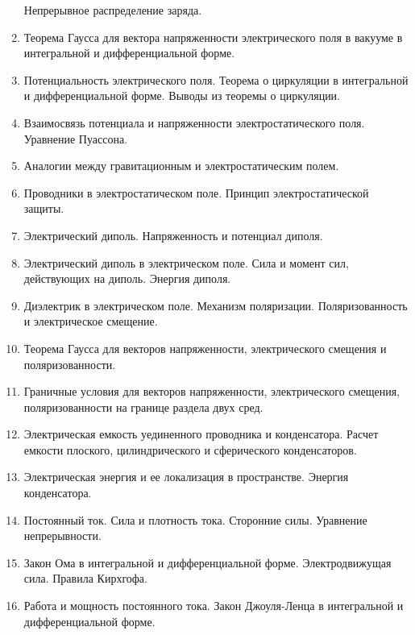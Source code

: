 \documentclass[12pt]{article}
\begin{document}
\begin{enumerate}
        Непрерывное распределение заряда.  
        \item Теорема Гаусса для вектора напряженности электрического поля в вакууме в 
        интегральной и дифференциальной форме.  
        \item Потенциальность электрического поля. Теорема о циркуляции в интегральной и 
        дифференциальной форме. Выводы из теоремы о циркуляции. 
        \item Взаимосвязь потенциала и напряженности электростатического поля. Уравнение 
        Пуассона.  
        \item Аналогии между гравитационным и электростатическим полем.  
        \item Проводники в электростатическом поле. Принцип электростатической защиты.  
        \item Электрический диполь. Напряженность и потенциал диполя. 
        \item Электрический диполь в электрическом поле. Сила и момент сил, действующих на 
        диполь. Энергия диполя. 
        \item Диэлектрик в электрическом поле. Механизм поляризации. Поляризованность и 
        электрическое смещение. 
        \item Теорема Гаусса для векторов напряженности, электрического смещения и 
        поляризованности.  
        \item Граничные условия для векторов напряженности, электрического смещения, 
        поляризованности на границе раздела двух сред.   
        \item Электрическая емкость уединенного проводника и конденсатора. Расчет емкости 
        плоского, цилиндрического и сферического конденсаторов. 
        \item Электрическая энергия и ее локализация в пространстве. Энергия конденсатора.   
        \item Постоянный ток. Сила и плотность тока. Сторонние силы. Уравнение непрерывности. 
        \item Закон Ома в интегральной и дифференциальной форме. Электродвижущая сила. Правила 
        Кирхгофа. 
        \item Работа и мощность постоянного тока. Закон Джоуля-Ленца в интегральной и 
        дифференциальной форме.
    \end{enumerate}

\end{document}
